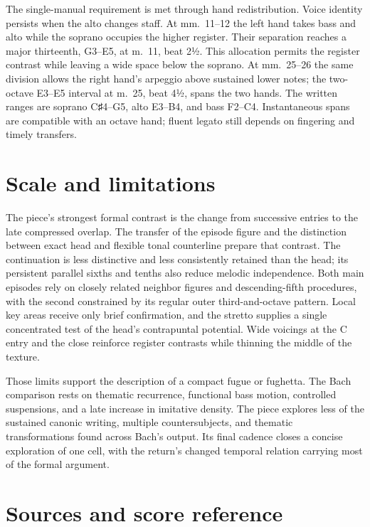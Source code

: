 \documentclass[11pt,a4paper]{article}
\begin{document}
The single-manual requirement is met through hand redistribution. Voice identity persists when the alto changes staff. At mm.~11--12 the left hand takes bass and alto while the soprano occupies the higher register. Their separation reaches a major thirteenth, G3--E5, at m.~11, beat 2½. This allocation permits the register contrast while leaving a wide space below the soprano. At mm.~25--26 the same division allows the right hand's arpeggio above sustained lower notes; the two-octave E3--E5 interval at m.~25, beat 4½, spans the two hands. The written ranges are soprano C♯4--G5, alto E3--B4, and bass F2--C4. Instantaneous spans are compatible with an octave hand; fluent legato still depends on fingering and timely transfers.

\section{Scale and limitations}\label{scale-and-limitations}

The piece's strongest formal contrast is the change from successive entries to the late compressed overlap. The transfer of the episode figure and the distinction between exact head and flexible tonal counterline prepare that contrast. The continuation is less distinctive and less consistently retained than the head; its persistent parallel sixths and tenths also reduce melodic independence. Both main episodes rely on closely related neighbor figures and descending-fifth procedures, with the second constrained by its regular outer third-and-octave pattern. Local key areas receive only brief confirmation, and the stretto supplies a single concentrated test of the head's contrapuntal potential. Wide voicings at the C entry and the close reinforce register contrasts while thinning the middle of the texture.

Those limits support the description of a compact fugue or fughetta. The Bach comparison rests on thematic recurrence, functional bass motion, controlled suspensions, and a late increase in imitative density. The piece explores less of the sustained canonic writing, multiple countersubjects, and thematic transformations found across Bach's output. Its final cadence closes a concise exploration of one cell, with the return's changed temporal relation carrying most of the formal argument.

\section{Sources and score reference}\label{sources-and-score-reference}
\end{document}
